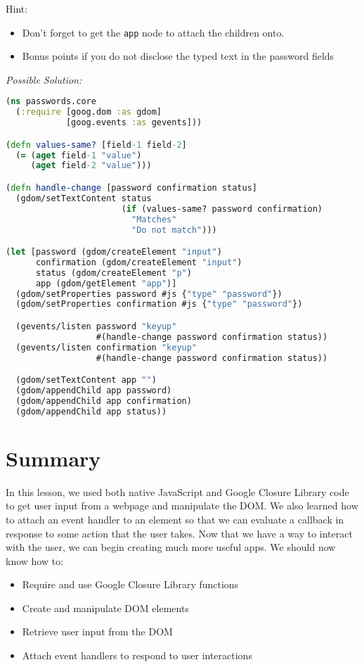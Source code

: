 \documentclass[10pt,twoside,openright]{memoir}
\begin{document}
Hint:

\begin{itemize}
\tightlist
\item
  Don't forget to get the \texttt{app} node to attach the children onto.
\item
  Bonus points if you do not disclose the typed text in the password
  fields
\end{itemize}

\emph{Possible Solution:}

\begin{lstlisting}[language=Clojure]
(ns passwords.core
  (:require [goog.dom :as gdom]
            [goog.events :as gevents]))

(defn values-same? [field-1 field-2]
  (= (aget field-1 "value")
     (aget field-2 "value")))

(defn handle-change [password confirmation status]
  (gdom/setTextContent status
                       (if (values-same? password confirmation)
                         "Matches"
                         "Do not match")))

(let [password (gdom/createElement "input")
      confirmation (gdom/createElement "input")
      status (gdom/createElement "p")
      app (gdom/getElement "app")]
  (gdom/setProperties password #js {"type" "password"})
  (gdom/setProperties confirmation #js {"type" "password"})

  (gevents/listen password "keyup"
                  #(handle-change password confirmation status))
  (gevents/listen confirmation "keyup"
                  #(handle-change password confirmation status))

  (gdom/setTextContent app "")
  (gdom/appendChild app password)
  (gdom/appendChild app confirmation)
  (gdom/appendChild app status))
\end{lstlisting}

\section{Summary}

In this lesson, we used both native JavaScript and Google Closure
Library code to get user input from a webpage and manipulate the DOM. We
also learned how to attach an event handler to an element so that we can
evaluate a callback in response to some action that the user takes. Now
that we have a way to interact with the user, we can begin creating much
more useful apps. We should now know how to:

\begin{itemize}
\tightlist
\item
  Require and use Google Closure Library functions
\item
  Create and manipulate DOM elements
\item
  Retrieve user input from the DOM
\item
  Attach event handlers to respond to user interactions
\end{itemize}
\end{document}
